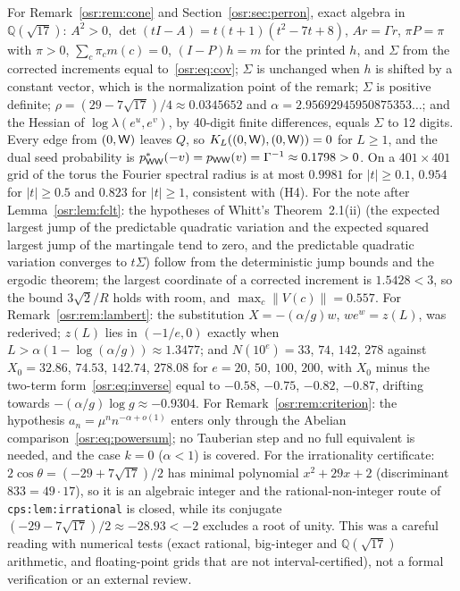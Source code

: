\documentclass[11pt,letterpaper]{article}
\newcommand{\Q}{\mathbb Q}\newcommand{\R}{\mathbb R}\newcommand{\Z}{\mathbb Z}
\newcommand{\G}{\Gamma}\newcommand{\s}{\sqrt{17}}
\numberwithin{equation}{section}
\begin{document}
For Remark~\ref{osr:rem:cone} and Section~\ref{osr:sec:perron}, exact algebra
in $\Q(\s)$: $A^2>0$, $\det(tI-A)=t(t+1)(t^2-7t+8)$, $Ar=\G r$, $\pi P=\pi$
with $\pi>0$, $\sum_c\pi_cm(c)=0$, $(I-P)h=m$ for the printed $h$, and
$\Sigma$ from the corrected increments equal to~\eqref{osr:eq:cov}; $\Sigma$
is unchanged when $h$ is shifted by a constant vector, which is the
normalization point of the remark; $\Sigma$ is positive definite;
$\rho=(29-7\s)/4\approx0.0345652$ and $\alpha=2.95692945950875353\ldots$; and
the Hessian of $\log\lambda(e^u,e^v)$, by 40-digit finite differences,
equals $\Sigma$ to 12 digits. Every edge from $(0,\mathsf W)$ leaves $Q$, so
$K_L((0,\mathsf W),(0,\mathsf W))=0$ for $L\ge1$, and the dual seed probability is
$p^*_{\W\W}(-v)=p_{\W\W}(v)=\G^{-1}\approx0.1798>0$. On a $401\times401$
grid of the torus the Fourier spectral radius is at most $0.9981$ for
$|t|\ge0.1$, $0.954$ for $|t|\ge0.5$ and $0.823$ for $|t|\ge1$, consistent
with (H4). For the note after Lemma~\ref{osr:lem:fclt}: the hypotheses of
Whitt's Theorem~2.1(ii) (the expected largest jump of the predictable
quadratic variation and the expected squared largest jump of the
martingale tend to zero, and the predictable quadratic variation converges
to $t\Sigma$) follow from the deterministic jump bounds and the
ergodic theorem; the largest coordinate of a corrected increment is
$1.5428<3$, so the bound $3\sqrt2/R$ holds with room, and
$\max_c\lVert V(c)\rVert=0.557$. For Remark~\ref{osr:rem:lambert}: the
substitution $X=-(\alpha/g)w$, $we^w=z(L)$, was rederived; $z(L)$ lies in
$(-1/e,0)$ exactly when $L>\alpha(1-\log(\alpha/g))\approx1.3477$; and
$N(10^e)=33$, $74$, $142$, $278$ against $X_0=32.86$, $74.53$, $142.74$,
$278.08$ for $e=20$, $50$, $100$, $200$, with $X_0$ minus the two-term
form~\eqref{osr:eq:inverse} equal to $-0.58$, $-0.75$, $-0.82$, $-0.87$,
drifting towards $-(\alpha/g)\log g\approx-0.9304$. For
Remark~\ref{osr:rem:criterion}: the hypothesis $a_n=\mu^nn^{-\alpha+o(1)}$
enters only through the Abelian comparison~\eqref{osr:eq:powersum}; no
Tauberian step and no full equivalent is needed, and the case
$k=0$ ($\alpha<1$) is covered. For the irrationality certificate:
$2\cos\theta=(-29+7\s)/2$ has minimal polynomial $x^2+29x+2$ (discriminant
$833=49\cdot17$), so it is an algebraic integer and the rational-non-integer
route of \nolinkurl{cps:lem:irrational} is closed, while its conjugate
$(-29-7\s)/2\approx-28.93<-2$ excludes a root of unity. This was a careful
reading with numerical tests (exact rational, big-integer and $\Q(\s)$
arithmetic, and floating-point grids that are not interval-certified), not
a formal verification or an external review.
\end{document}
